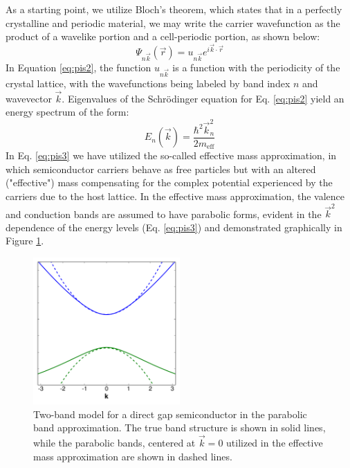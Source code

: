 As a starting point, we utilize Bloch's theorem, which states that in a perfectly crystalline and periodic material, we may write the carrier wavefunction as the product of a wavelike portion and a cell-periodic portion, as shown below:
\begin{equation}\label{eq:pis2}
\Psi_{n\vec{k}}(\vec{r}) = u_{n\vec{k}}e^{i\vec{k}\cdot\vec{r}}
\end{equation}
In Equation \ref{eq:pis2}, the function $u_{n\vec{k}}$ is a function with the periodicity of the crystal lattice, with the wavefunctions being labeled by band index $n$ and wavevector $\vec{k}$. Eigenvalues of the Schr{\"o}dinger equation for Eq. \ref{eq:pis2} yield an energy spectrum of the form:
\begin{equation}\label{eq:pis3}
E_{n}\left(\vec{k}\right) = \frac{\hbar^2\vec{k}_n^2}{2m_{\mathrm{eff}}}
\end{equation}
In Eq. \ref{eq:pis3} we have utilized the so-called effective mass approximation, in which semiconductor carriers behave as free particles but with an altered ("effective") mass compensating for the complex potential experienced by the carriers due to the host lattice. In the effective mass approximation, the valence and conduction bands are assumed to have parabolic forms, evident in the $\vec{k}^2$ dependence of the energy levels (Eq. \ref{eq:pis3}) and demonstrated graphically in Figure \ref{f:pis1}. \par

\begin{figure}
\begin{center}
\includegraphics[width=0.5\textwidth]{./Chapter1/parabolic.pdf}
\caption[Two-band model for a direct gap semiconductor in the parabolic band approximation.]{Two-band model for a direct gap semiconductor in the parabolic band approximation. The true band structure is shown in solid lines, while the parabolic bands, centered at $\vec{k} = 0$ utilized in the effective mass approximation are shown in dashed lines.}
\label{f:pis1}
\end{center}
\end{figure}


